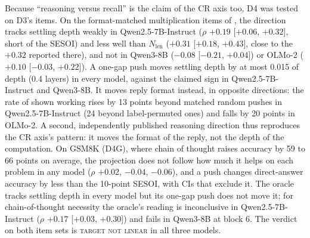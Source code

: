 \documentclass[11pt]{article}
\newcommand{\verdict}[1]{\textsc{\MakeLowercase{#1}}}
\begin{document}
Because ``reasoning versus recall'' is the claim of the CR axis too, D4 was tested on D3's items. On the format-matched multiplication items of \citet{ramdan2026crv2}, the direction tracks settling depth weakly in Qwen2.5-7B-Instruct ($\rho$ $+0.19$ [$+0.06$, $+0.32$], short of the SESOI) and less well than $N_\text{len}$ ($+0.31$ [$+0.18$, $+0.43$], close to the $+0.32$ reported there), and not in Qwen3-8B ($-0.08$ [$-0.21$, $+0.04$]) or OLMo-2 ($+0.10$ [$-0.03$, $+0.22$]). A one-gap push moves settling depth by at most 0.015 of depth (0.4 layers) in every model, against the claimed sign in Qwen2.5-7B-Instruct and Qwen3-8B. It moves reply format instead, in opposite directions: the rate of shown working rises by 13 points beyond matched random pushes in Qwen2.5-7B-Instruct (24 beyond label-permuted ones) and falls by 20 points in OLMo-2. A second, independently published reasoning direction thus reproduces the CR axis's pattern: it moves the format of the reply, not the depth of the computation. On GSM8K \citep{cobbe2021gsm8k} (D4G), where chain of thought raises accuracy by 59 to 66 points on average, the projection does not follow how much it helps on each problem in any model ($\rho$ $+0.02$, $-0.04$, $-0.06$), and a push changes direct-answer accuracy by less than the 10-point SESOI, with CIs that exclude it. The oracle tracks settling depth in every model but its one-gap push does not move it; for chain-of-thought necessity the oracle's reading is inconclusive in Qwen2.5-7B-Instruct ($\rho$ $+0.17$ [$+0.03$, $+0.30$]) and fails in Qwen3-8B at block 6. The verdict on both item sets is \verdict{TARGET NOT LINEAR} in all three models.
\end{document}
